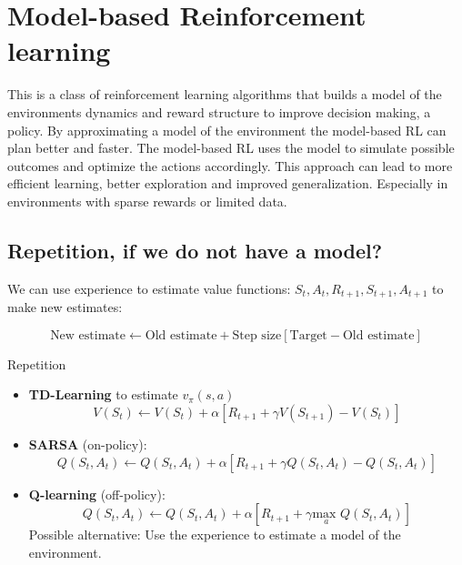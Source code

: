 \section{Model-based Reinforcement learning}
This is a class of reinforcement learning algorithms that builds a model of the environments dynamics and reward structure to improve decision making, a policy. By approximating a model of the environment the model-based RL can plan better and faster. The model-based RL uses the model to simulate possible outcomes and optimize the actions accordingly. This approach can lead to more efficient learning, better exploration and improved generalization. Especially in environments with sparse rewards or limited data. 

\subsection*{Repetition, if we do not have a model?}
We can use experience to estimate value functions: $S_t, A_t, R_{t+1}, S_{t+1}, A_{t+1}$ to make new estimates:

	\begin{equation}
		\text{New estimate} \leftarrow \text{Old estimate} + \text{Step size} [\text{Target} - \text{Old estimate}]
	\end{equation}

\begin{wbox}{Repetition}
\begin{itemize}
	\item \textbf{TD-Learning} to estimate $v_\pi(s,a)$
		\begin{equation}
			V(S_t) \leftarrow V(S_t) + \alpha [R_{t+1} + \gamma V(S_{t+1}) - V(S_t)]
		\end{equation}
	\item \textbf{SARSA} (on-policy): 
		\begin{equation}
			Q(S_t, A_t) \leftarrow Q(S_t,A_t) + \alpha[R_{t+1} + \gamma Q(S_t,A_t) - Q(S_t,A_t)] 
		\end{equation}
	\item \textbf{Q-learning} (off-policy):
		\begin{equation}
			Q(S_t, A_t) \leftarrow Q(S_t,A_t) + \alpha [R_{t+1} + \gamma \underset{a}{\text{max }}Q(S_t,A_t)]
		\end{equation}
		Possible alternative: Use the experience to estimate a model of the environment. 
\end{itemize}
\end{wbox}


